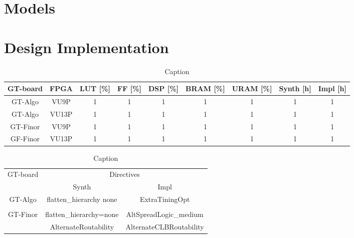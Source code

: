 \documentclass[../main.tex]{subfiles}
\begin{document}
\appendix

\chapter{Models}
\label{sec:App_Code}
    
\chapter{Design Implementation}
\label{sec:App_Desgin}

\begin{table}[h]
    \centering
    \begin{tabular}{c|c|c|c|c|c|c|c|c}
        GT-board & FPGA & LUT [\%] & FF [\%] & DSP [\%] & BRAM [\%] & URAM [\%] & Synth [h] & Impl [h] \\
        \hline
        GT-Algo   & VU9P  & 1 & 1 & 1 & 1 & 1 & 1 & 1  \\
        GT-Algo   & VU13P & 1 & 1 & 1 & 1 & 1 & 1 & 1  \\
        GT-Finor  & VU9P  & 1 & 1 & 1 & 1 & 1 & 1 & 1  \\
        GF-Finor  & VU13P & 1 & 1 & 1 & 1 & 1 & 1 & 1  \\
    \end{tabular}
    \caption{Caption}
    \label{tab:Design-impl}
\end{table}

\begin{table}[h]
    \centering
    \begin{tabular}{c|c|c}
        \multirow{2}{*}{GT-board} & \multicolumn{2}{c}{Directives} \\
        & Synth & Impl \\
        \hline
        \multirow{2}{*}{GT-Algo}    & flatten\_hierarchy none &  ExtraTiningOpt \\
           &  &   \\
        \multirow{2}{*}{GT-Finor}  & flatten\_hierarchy=none & AltSpreadLogic\_medium  \\
           &  AlternateRoutability & AlternateCLBRoutability \\
    \end{tabular}
    \caption{Caption}
    \label{tab:Design-directivesl}
\end{table}
    
\end{document}
